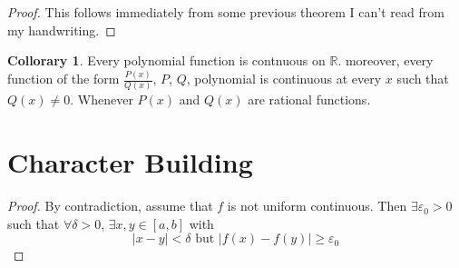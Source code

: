 \documentclass[a4paper, notitlepage]{report}
\newcommand{\df}[2]{\displaystyle\frac{#1}{#2}}
\newtheorem{theorem}{Theorem}
\theoremstyle{remark}
\theoremstyle{definition}
\newtheorem*{col}{Collorary}
\begin{document}
	    \begin{proof}
	    This follows immediately from some previous theorem I can't read
	    from my handwriting.
	    \end{proof}

	    \begin{col}
	      Every polynomial function is contnuous on \( \mathbb{R} \).
	      moreover, every function of the form \( \df{P(x)}{Q(x)} \), \(
	      P \), \( Q \), polynomial is continuous at every \( x \) such
	      that \( Q(x) \neq 0 \). Whenever \( P(x) \) and \( Q(x) \) are
	      rational functions.
	    \end{col}

	    \section{Character Building}
	    \begin{center}
	    \end{center}

	    \begin{proof}
	    By contradiction, assume that \( f \) is not uniform continuous.
	    Then \( \exists \varepsilon_0 > 0 \) such that \( \forall \delta
	    > 0 \), \( \exists x,y \in [a,b] \) with 
	    \[ 
	      |x-y| < \delta \text{ but } |f(x) - f(y)| \geq \varepsilon_0
	    \]
	    \end{proof}
	    \begin{center}
	    \end{center}
	    
	    
	    
	    
\end{document}
